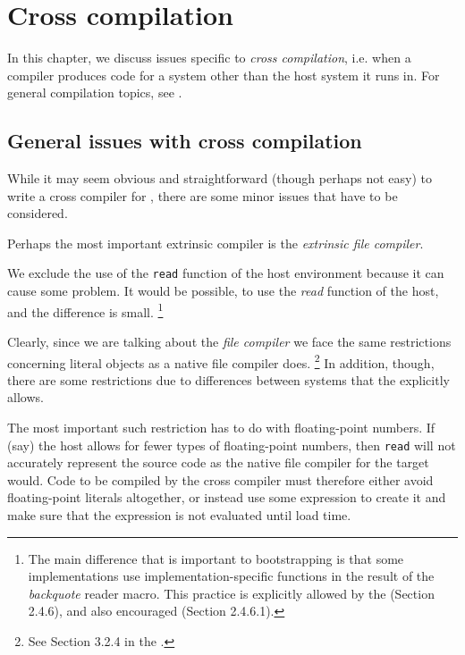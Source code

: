 \chapter{Cross compilation}
\label{chap-cross-compilation}

In this chapter, we discuss issues specific to \emph{cross
  compilation}, i.e. when a compiler produces code for a system other
than the host \commonlisp{} system it runs in.  For general compilation
topics, see .

\section{General issues with cross compilation}

While it may seem obvious and straightforward (though perhaps not
easy) to write a cross compiler for \commonlisp{}, there are some minor issues
that have to be considered. 

Perhaps the most important extrinsic compiler is the \emph{extrinsic
  file compiler}.

We exclude the use of the \texttt{read} function of the host
environment because it can cause some problem.  It would be possible,
to use the \emph{read} function of the host, and the difference is
small.%
\footnote{The main difference that is important to bootstrapping is
  that some implementations use implementation-specific functions in
  the result of the \emph{backquote} reader macro.  This practice is
  explicitly allowed by the \hs{} (Section 2.4.6), and also encouraged
  (Section 2.4.6.1).}

Clearly, since we are talking about the \emph{file compiler} we face
the same restrictions concerning literal objects as a native file
compiler does.%
\footnote{See Section 3.2.4 in the \hs{}.} %
In addition, though, there are some restrictions due to differences
between systems that the \hs{} explicitly allows.  

The most important such restriction has to do with floating-point
numbers.  If (say) the host allows for fewer types of floating-point
numbers, then \texttt{read} will not accurately represent the source
code as the native file compiler for the target would.  Code to be
compiled by the cross compiler must therefore either avoid
floating-point literals altogether, or instead use some expression to
create it and make sure that the expression is not evaluated until
load time.  

